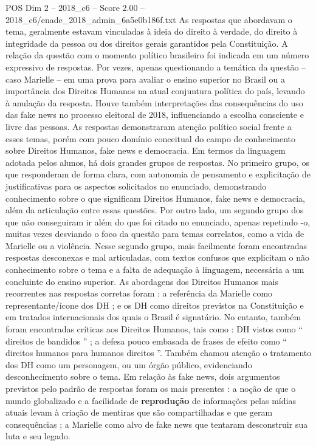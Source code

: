 \begin{textsample}{POS Dim 2 – 2018\_c6 – Score 2.00 – 2018\_c6/enade\_2018\_admin\_6a5e0b186f.txt}
As respostas que abordavam o tema, geralmente estavam vinculadas à ideia do direito à verdade, do direito à integridade da pessoa ou dos direitos gerais garantidos pela Constituição.
A relação da questão com o momento político brasileiro foi indicada em um número expressivo de respostas.
Por vezes, apenas questionando a temática da questão – caso Marielle – em uma prova para avaliar o ensino superior no Brasil ou a importância dos Direitos Humanos na atual conjuntura política do país, levando à anulação da resposta.
Houve também interpretações das consequências do uso das fake news no processo eleitoral de 2018, influenciando a escolha consciente e livre das pessoas.
As respostas demonstraram atenção político social frente a esses temas, porém com pouco domínio conceitual do campo de conhecimento sobre Direitos Humanos, fake news e democracia.
Em termos da linguagem adotada pelos alunos, há dois grandes grupos de respostas.
No primeiro grupo, os que responderam de forma clara, com autonomia de pensamento e explicitação de justificativas para os aspectos solicitados no enunciado, demonstrando conhecimento sobre o que significam Direitos Humanos, fake news e democracia, além da articulação entre essas questões.
Por outro lado, um segundo grupo dos que não conseguiram ir além do que foi citado no enunciado, apenas repetindo -o, muitas vezes desviando o foco da questão para temas correlatos, como a vida de Marielle ou a violência.
Nesse segundo grupo, mais facilmente foram encontradas respostas desconexas e mal articuladas, com textos confusos que explicitam o não conhecimento sobre o tema e a falta de adequação à linguagem, necessária a um concluinte do ensino superior.
As abordagens dos Direitos Humanos mais recorrentes nas respostas corretas foram : a referência da Marielle como representante/ícone dos DH ; e os DH como direitos previstos na Constituição e em tratados internacionais dos quais o Brasil é signatário.
No entanto, também foram encontradas críticas aos Direitos Humanos, tais como : DH vistos como “ direitos de bandidos ” ; a defesa pouco embasada de frases de efeito como “ direitos humanos para humanos direitos ”.
Também chamou atenção o tratamento dos DH como um personagem, ou um órgão público, evidenciando desconhecimento sobre o tema.
Em relação às fake news, dois argumentos previstos pelo padrão de respostas foram os mais presentes : a noção de que o mundo globalizado e a facilidade de \textbf{reprodução} de informações pelas mídias atuais levam à criação de mentiras que são compartilhadas e que geram consequências ; a Marielle como alvo de fake news que tentaram desconstruir sua luta e seu legado.

\end{textsample}
